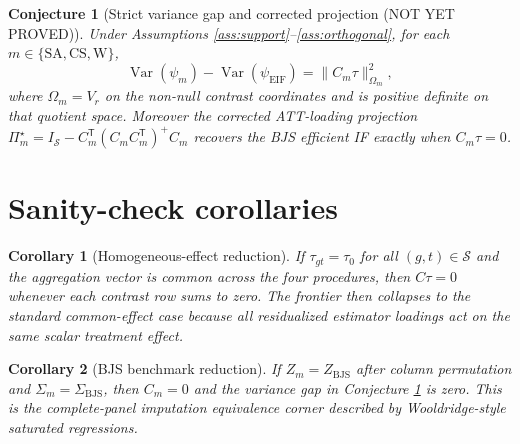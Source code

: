 \documentclass[11pt]{article}
\newcommand{\transpose}{\mathsf{T}}
\theoremstyle{definition}
\theoremstyle{plain}
\newtheorem{conjecture}{Conjecture}
\newtheorem{corollary}{Corollary}
\theoremstyle{remark}
\begin{document}
\begin{conjecture}[Strict variance gap and corrected projection (NOT YET PROVED)]\label{conj:gap}
Under Assumptions \ref{ass:support}--\ref{ass:orthogonal}, for each
$m\in\{\mathrm{SA},\mathrm{CS},\mathrm{W}\}$,
\[
  \operatorname{Var}(\psi_m)-\operatorname{Var}(\psi_{\mathrm{EIF}})
  = \|C_m\tau\|_{\Omega_m}^{2},
\]
where $\Omega_m=V_r$ on the non-null contrast coordinates and is positive
definite on that quotient space.  Moreover the corrected ATT-loading
projection
$\Pi_m^\star=I_{\mathcal S}-C_m^\transpose(C_m C_m^\transpose)^+C_m$
recovers the BJS efficient IF exactly when
$C_m\tau=0$.
\end{conjecture}

\section{Sanity-check corollaries}
\begin{corollary}[Homogeneous-effect reduction]\label{cor:homogeneous}
If $\tau_{gt}=\tau_0$ for all $(g,t)\in\mathcal S$ and the aggregation vector
is common across the four procedures, then $C\tau=0$ whenever each contrast
row sums to zero.  The frontier then collapses to the standard common-effect
case because all residualized estimator loadings act on the same scalar
treatment effect.
\end{corollary}

\begin{corollary}[BJS benchmark reduction]\label{cor:bjs}
If $Z_m=Z_{\mathrm{BJS}}$ after column permutation and
$\Sigma_m=\Sigma_{\mathrm{BJS}}$, then $C_m=0$ and the variance gap in
Conjecture \ref{conj:gap} is zero.  This is the complete-panel imputation
equivalence corner described by Wooldridge-style saturated regressions.
\end{corollary}
\end{document}
